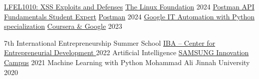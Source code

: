 
    \begin{cvhonors}
        \cvhonor
            {\href{https://www.credly.com/badges/fef42096-4e09-41ea-9caf-c1b908d23658/public_url}{LFEL1010: XSS Exploits and Defenses}} %
            {\href{https://training.linuxfoundation.org/}{The Linux Foundation}} %
            {\hspace{-2em}\entrylocationstyle {}} %
            {2024} %
        \cvhonor
            {\href{https://badgr.com/public/assertions/196LrlAyQcmY8NvMpsGKNQ}{Postman API Fundamentals Student Expert}} %
            {\href{https://postman.com/}{Postman}} %
            {\hspace{-2em}\entrylocationstyle {}} %
            {2024} %
         \cvhonor
            {\href{https://www.coursera.org/account/accomplishments/specialization/certificate/4P9VR6DR3KXA}{Google IT Automation with Python specialization}} %
            {\href{https://www.coursera.org/}{Coursera \& Google}} %
            {\hspace{-2em}\entrylocationstyle {}} %
            {2023} %
        
        \cvhonor
            {7th International Entrepreneurship Summer School}
            {\href{https://ced.iba.edu.pk/}{IBA – Center for Entrepreneurial Development }}
            {\hspace{-2em}} 
            {2022}
        \cvhonor
            {Artificial Intelligence}
            {\href{https://www.samsung.com/pk/innovation-campus/}{SAMSUNG Innovation Campus}}
            {\hspace{-2em}} 
            {2021}
        \cvhonor
            {Machine Learning with Python}
            {Mohammad Ali Jinnah University}
            {\hspace{-2em}} 
            {2020}
    \end{cvhonors}
    